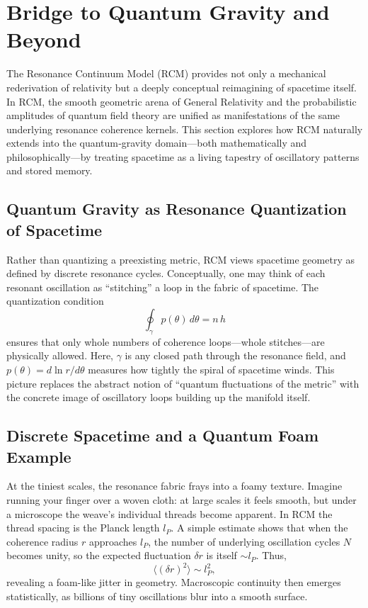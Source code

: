 \section{Bridge to Quantum Gravity and Beyond}

The Resonance Continuum Model (RCM) provides not only a mechanical rederivation of relativity but a deeply conceptual reimagining of spacetime itself.  In RCM, the smooth geometric arena of General Relativity and the probabilistic amplitudes of quantum field theory are unified as manifestations of the same underlying resonance coherence kernels.  This section explores how RCM naturally extends into the quantum‐gravity domain—both mathematically and philosophically—by treating spacetime as a living tapestry of oscillatory patterns and stored memory.

\subsection{Quantum Gravity as Resonance Quantization of Spacetime}

Rather than quantizing a preexisting metric, RCM views spacetime geometry as defined by discrete resonance cycles.  Conceptually, one may think of each resonant oscillation as “stitching” a loop in the fabric of spacetime.  The quantization condition
\[
\oint_{\gamma} p(\theta)\,d\theta = n\,h
\]
ensures that only whole numbers of coherence loops—whole stitches—are physically allowed.  Here, \(\gamma\) is any closed path through the resonance field, and \(p(\theta)=d\ln r/d\theta\) measures how tightly the spiral of spacetime winds.  This picture replaces the abstract notion of “quantum fluctuations of the metric” with the concrete image of oscillatory loops building up the manifold itself.

\subsection{Discrete Spacetime and a Quantum Foam Example}

At the tiniest scales, the resonance fabric frays into a foamy texture.  Imagine running your finger over a woven cloth: at large scales it feels smooth, but under a microscope the weave’s individual threads become apparent.  In RCM the thread spacing is the Planck length \(l_P\).  A simple estimate shows that when the coherence radius \(r\) approaches \(l_P\), the number of underlying oscillation cycles \(N\) becomes unity, so the expected fluctuation \(\delta r\) is itself \(\sim l_P\).  Thus,
\[
\langle(\delta r)^2\rangle \sim l_P^2,
\]
revealing a foam-like jitter in geometry.  Macroscopic continuity then emerges statistically, as billions of tiny oscillations blur into a smooth surface.

